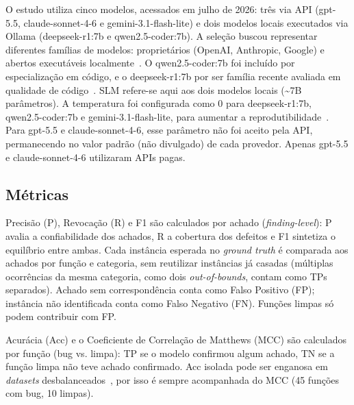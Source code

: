 \documentclass[sigconf]{acmart}
\begin{document}
O estudo utiliza cinco modelos, acessados em julho de 2026: três via API (gpt-5.5, claude-sonnet-4-6 e gemini-3.1-flash-lite) e dois modelos locais executados via Ollama (deepseek-r1:7b e qwen2.5-coder:7b). A seleção buscou representar diferentes famílias de modelos: proprietários (OpenAI, Anthropic, Google) e abertos executáveis localmente~\cite{ding2025primevul}. O qwen2.5-coder:7b foi incluído por especialização em código, e o deepseek-r1:7b por ser família recente avaliada em qualidade de código~\cite{orvalho2025pyveritas,souza2026beyondstrictrules}. SLM refere-se aqui aos dois modelos locais (\textasciitilde7B parâmetros). A temperatura foi configurada como 0 para deepseek-r1:7b, qwen2.5-coder:7b e gemini-3.1-flash-lite, para aumentar a reprodutibilidade~\cite{orvalho2025pyveritas}. Para gpt-5.5 e claude-sonnet-4-6, esse parâmetro não foi aceito pela API, permanecendo no valor padrão (não divulgado) de cada provedor. Apenas gpt-5.5 e claude-sonnet-4-6 utilizaram APIs pagas.




\subsection{Métricas}
\label{sec:metricas}

Precisão (P), Revocação (R) e F1 são calculados por achado
(\textit{finding-level}): P avalia a confiabilidade dos achados, R a cobertura dos defeitos e F1 sintetiza o equilíbrio entre ambas. Cada instância esperada no \textit{ground truth} é
comparada aos achados por função e categoria, sem reutilizar instâncias já
casadas (múltiplas ocorrências da mesma categoria, como dois
\textit{out-of-bounds}, contam como TPs separados). Achado sem
correspondência conta como Falso Positivo (FP); instância não identificada
conta como Falso Negativo (FN). Funções limpas só podem contribuir com FP.

Acurácia (Acc) e o Coeficiente de Correlação de Matthews (MCC) são
calculados por função (bug vs. limpa): TP se o modelo confirmou algum achado,
TN se a função limpa não teve achado confirmado. Acc isolada pode ser enganosa
em \textit{datasets} desbalanceados~\cite{ding2025primevul}, por isso é sempre
acompanhada do MCC (45 funções com bug, 10 limpas).
\end{document}
